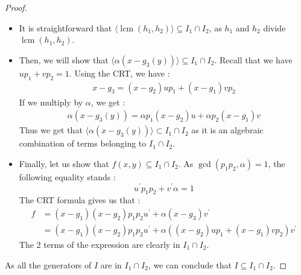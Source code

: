 \documentclass{article}
\DeclareMathOperator{\lcm}{lcm}
\begin{document}
\begin{flushleft}
\begin{proof}
    \begin{itemize}
        \item It is straightforward that $\langle \lcm(h_{1}, h_{2}) \rangle \subseteq I_{1} \cap I_{2}$, as $h_{1}$ and $h_{2}$ divide $\lcm(h_{1}, h_{2})$.
        \item Then, we will show that  $\langle \alpha (x - g_{3}(y)) \rangle \subseteq I_{1} \cap I_{2}$. Recall that we have $up_{1} + vp_{2} = 1$.
        Using the CRT, we have : 
        \begin{align*}
            x - g_{3} = (x - g_{2})up_{1} + (x - g_{1})vp_{2}
        \end{align*}
        If we multiply by $\alpha$, we get :
        \begin{align*}
            \alpha (x - g_{3}(y)) =  \alpha p_{1} (x - g_{2})u + \alpha p_{2} (x - g_{1})v
        \end{align*}
        Thus we get that $\langle \alpha (x - g_{3}(y)) \rangle \subset I_{1} \cap I_{2}$ as it is an algebraic combination of terms belonging to $I_{1} \cap I_{2}$.
        \item Finally, let us show that $f(x, y) \subseteq I_{1} \cap I_{2} $. As $\gcd(p_{1}p_{2}, \alpha) = 1$, the following equality stands :
        \begin{displaymath}
            u^{\prime} p_{1}p_{2} + v^{\prime} \alpha = 1
        \end{displaymath}
        The CRT formula gives us that : 
        \begin{align*}
            f & = (x - g_{1})(x - g_{2}) p_{1}p_{2} u^{\prime} + \alpha (x - g_{3}) v^{\prime} \\
              & = (x - g_{1})(x - g_{2}) p_{1}p_{2} u^{\prime} + \alpha ((x - g_{2})up_{1} + (x - g_{1})vp_{2}) v^{\prime}
        \end{align*}
        The 2 terms of the expression are clearly in $I_{1} \cap I_{2}$. 
    \end{itemize}

    As all the generators of $I$ are in $I_{1} \cap I_{2}$, we can conclude that $I \subseteq I_{1} \cap I_{2}$.
\end{proof}



\end{flushleft}
\end{document}
